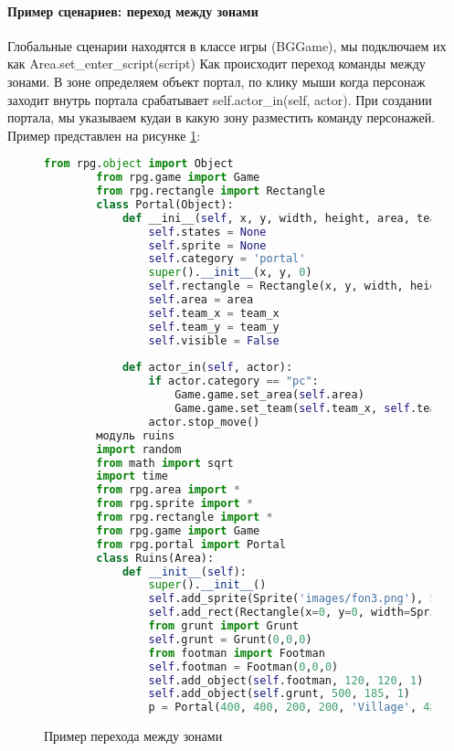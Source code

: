 \paragraph{Пример сценариев: переход между зонами}
Глобальные сценарии находятся в классе игры (BGGame), мы подключаем их как
Area.set\_enter\_script(script)
Как происходит переход команды между зонами.
В зоне определяем объект портал, по клику мыши когда персонаж заходит внутрь портала срабатывает self.actor\_in(self, actor). При создании портала, мы указываем кудаи в какую зону разместить команду персонажей.
Пример представлен на рисунке \ref{portal:image}:
\begin{figure}[H]
	\begin{lstlisting}[language=Python]
		from rpg.object import Object
		from rpg.game import Game
		from rpg.rectangle import Rectangle	
		class Portal(Object):
			def __ini__(self, x, y, width, height, area, team_x, team_y):
				self.states = None
				self.sprite = None
				self.category = 'portal'
				super().__init__(x, y, 0)
				self.rectangle = Rectangle(x, y, width, height)
				self.area = area
				self.team_x = team_x
				self.team_y = team_y
				self.visible = False
			
			def actor_in(self, actor):
				if actor.category == "pc":
					Game.game.set_area(self.area)
					Game.game.set_team(self.team_x, self.team_y, 100)
				actor.stop_move()		
		модуль ruins
		import random
		from math import sqrt
		import time
		from rpg.area import *
		from rpg.sprite import *
		from rpg.rectangle import *
		from rpg.game import Game
		from rpg.portal import Portal
		class Ruins(Area):
			def __init__(self):
				super().__init__()
				self.add_sprite(Sprite('images/fon3.png'), 590, 400, 0)
				self.add_rect(Rectangle(x=0, y=0, width=Sprite('images/fon3.png').image.width(), height=Sprite('images/fon3.png').image.height()))
				from grunt import Grunt
				self.grunt = Grunt(0,0,0)
				from footman import Footman
				self.footman = Footman(0,0,0)
				self.add_object(self.footman, 120, 120, 1)
				self.add_object(self.grunt, 500, 185, 1)
				p = Portal(400, 400, 200, 200, 'Village', 480, 100)
	\end{lstlisting}  
	\caption{Пример перехода между зонами}
	\label{portal:image}
\end{figure}

